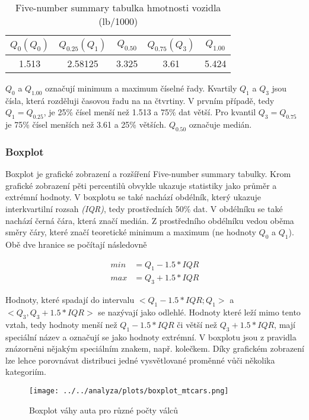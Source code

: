 \begin{table}[H]

    \centering
    \begin{tabular}[t]{c|c|c|c|c}
        \hline
        $Q_{0} (Q_0)$ & $Q_{0.25} (Q_1) $ & $Q_{0.50}$ & $Q_{0.75} (Q_3)$ & $Q_{1.00}$\\
        \hline
        1.513 & 2.58125 & 3.325 & 3.61 & 5.424\\
        \hline
    \end{tabular}
    \caption{\label{tab:five-number_summary}Five-number summary tabulka hmotnosti vozidla (lb/1000)}
\end{table}

$Q_{0}$ a $Q_{1.00}$ označují minimum a maximum číselné řady. Kvartily $Q_{1}$ a $Q_{3}$ jsou čísla, která rozděluji časovou řadu na na čtvrtiny. V prvním
případě, tedy $Q_1 = Q_{0.25}$, je 25\% čísel menší než 1.513 a 75\% dat větší. Pro kvantil $Q_3 = Q_{0.75}$ je 75\% čísel menších než 3.61 a 25\% větších. $Q_{0.50}$ označuje medián.

\subsubsection{Boxplot}
Boxplot je grafické zobrazení a rozšíření Five-number summary tabulky. Krom grafické zobrazení pěti percentilů obvykle ukazuje statistiky jako průměr a extrémní hodnoty.
V boxplotu se také nachází obdélník, který ukazuje interkvartilní rozsah \textit{(IQR)}, tedy prostředních 50\% dat. V obdélníku se také nachází černá čára, která značí medián.
Z prostředního obdélníku vedou oběma směry čáry, které značí teoretické minimum a maximum (ne hodnoty $Q_0$ a $Q_1$). Obě dve hranice se počítají následovně

\begin{align}
    min &= Q_1 - 1.5 * IQR \\
    max &= Q_3 + 1.5 * IQR
\end{align}

Hodnoty, které spadají do intervalu $<Q_1 - 1.5 * IQR ; Q_1>$ a $<Q_3, Q_3 + 1.5 * IQR>$ se nazývají jako odlehlé. Hodnoty které leží mimo tento vztah,
tedy hodnoty menší než $Q_1 - 1.5 * IQR$ či větší než $Q_3 + 1.5 * IQR$, mají speciální název a označují se jako hodnoty extrémní.
V boxplotu jsou z pravidla znázorněni nějakým speciálním znakem, např. kolečkem.
Díky grafickém zobrazení lze lehce porovnávat distribuci jedné vysvětlované proměnné vůči několika kategoriím.

\begin{figure}[H]
    \centering
    \texttt{[image: ../../analyza/plots/boxplot\_mtcars.png]}
    \caption{Boxplot váhy auta pro různé počty válců} 
    \label{fig:boxplot_mtcars}
\end{figure}

